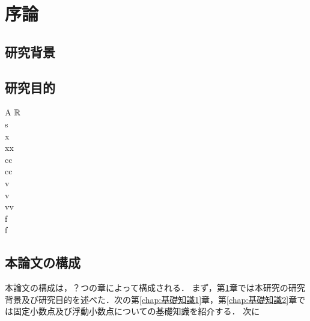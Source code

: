 \chapter{序論}
\label{chap:序論}
\section{研究背景}

\section{研究目的}
A $\mathbb{R}$ \\
s \\
x\\
xx\\
cc \\
cc\\
v\\
v\\
vv\\
f\\
f\\
\section{本論文の構成}
本論文の構成は，？つの章によって構成される．
まず，第\ref{chap:序論}章では本研究の研究背景及び研究目的を述べた．次の第\ref{chap:基礎知識1}章，第\ref{chap:基礎知識2}章では固定小数点及び浮動小数点についての基礎知識を紹介する．
次に\cite{hopkins2020stochastic}
